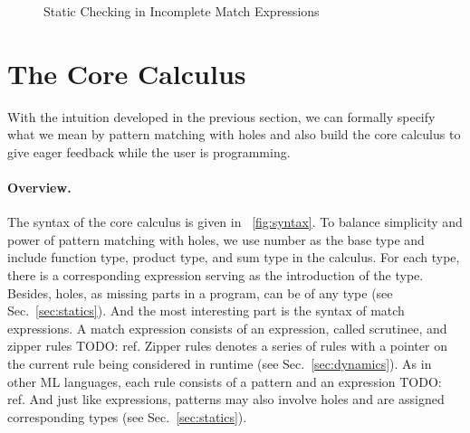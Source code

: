 \documentclass[runningheads,envcountsame,a4paper]{llncs}
\newcommand{\todo}[1]{{\color{red} TODO: #1}}
\begin{document}
\begin{figure}[ht]
  \centering
  \hspace*{\fill}%
  \hfill%
  \hspace*{\fill}%
  \caption{Static Checking in Incomplete Match Expressions}
  \label{fig:exh-red-hole}
\end{figure}

\section{The Core Calculus}
With the intuition developed in the previous section, we can formally specify
what we mean by pattern matching with holes and also build the core calculus to
give eager feedback while the user is programming.


\paragraph{Overview.}
The syntax of the core calculus is given in \figurename~\ref{fig:syntax}. To
balance simplicity and power of pattern matching with holes, we use number as
the base type and include function type, product type, and sum type in the
calculus. For each type, there is a corresponding expression serving as the
introduction of the type. Besides, holes, as missing parts in a program, can be
of any type (see Sec.~\ref{sec:statics}). And the most interesting part is the
syntax of match expressions. A match expression consists of an expression,
called scrutinee, and zipper rules \todo{ref}. Zipper rules denotes a series of
rules with a pointer on the current rule being considered in runtime (see
Sec.~\ref{sec:dynamics}). As in other ML languages, each rule consists of a
pattern and an expression \todo{ref}. And just like expressions, patterns may
also involve holes and are assigned corresponding types (see Sec.~\ref{sec:statics}).
\end{document}
